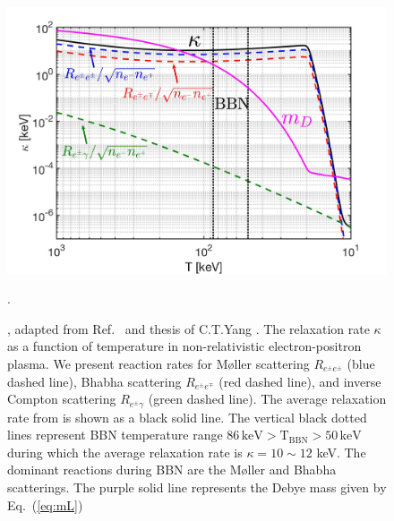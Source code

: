 

\begin{figure}[h!]
\begin{center}
\includegraphics[width=0.95\linewidth]{plots/chap03BBN/May152023Kappa_EPPlasma002}
\caption{, adapted from Ref.~\cite{Grayson:2023flr} and thesis of C.T.Yang \cite{Yang:2024ret}. The relaxation rate $\kappa$ as a function of temperature in non-relativistic electron-positron plasma. We present reaction rates for M{\o}ller scattering $R_{e^\pm e^\pm}$ (blue dashed line), Bhabha scattering $R_{e^\pm e^\mp}$ (red dashed line), and inverse Compton scattering $R_{e^\pm \gamma}$ (green dashed line). The average relaxation rate from   is shown as a black solid line. The vertical black dotted lines represent BBN temperature range $86\,\mathrm{keV}>\mathrm{T_{BBN}}>50\,\mathrm{keV}$ during which the average relaxation rate is $\kappa=10\sim12$ keV. The dominant reactions during BBN are the M{\o}ller and Bhabha scatterings. The purple solid line represents the Debye mass given by Eq.~(\ref{eq:mL})}.
\label{Fig:RelaxationRate}
\end{center}
\end{figure}

